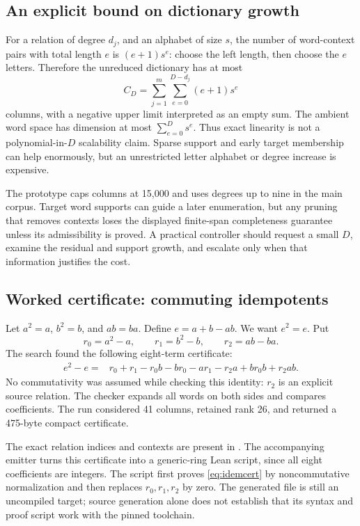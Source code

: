 \documentclass[11pt,letterpaper]{article}
\theoremstyle{definition}\newtheorem{definition}[theorem]{Definition}
\theoremstyle{remark}\newtheorem{remark}[theorem]{Remark}
\begin{document}
\subsection{An explicit bound on dictionary growth}
For a relation of degree $d_j$, and an alphabet of size $s$, the number of
word-context pairs with total length $e$ is $(e+1)s^e$: choose the left length,
then choose the $e$ letters. Therefore the unreduced dictionary has at most
\begin{equation}
 C_D=\sum_{j=1}^m\sum_{e=0}^{D-d_j}(e+1)s^e
 \label{eq:nccost}
\end{equation}
columns, with a negative upper limit interpreted as an empty sum. The ambient
word space has dimension at most $\sum_{e=0}^{D}s^e$.
Thus exact linearity is not a polynomial-in-$D$ scalability claim. Sparse
support and early target membership can help enormously, but an unrestricted
letter alphabet or degree increase is expensive.

The prototype caps columns at 15,000 and uses degrees up to nine in the main
corpus. Target word supports can guide a later enumeration, but any pruning
that removes contexts loses the displayed finite-span completeness guarantee
unless its admissibility is proved. A practical controller should request a
small $D$, examine the residual and support growth, and escalate only when that
information justifies the cost.

\subsection{Worked certificate: commuting idempotents}
Let $a^2=a$, $b^2=b$, and $ab=ba$. Define $e=a+b-ab$. We want $e^2=e$.
Put
\[
 r_0=a^2-a,\qquad r_1=b^2-b,\qquad r_2=ab-ba.
\]
The search found the following eight-term certificate:
\begin{align}
 e^2-e={}&r_0+r_1-r_0b-br_0-ar_1-r_2a
             +br_0b+r_2ab.\label{eq:idemcert}
\end{align}
No commutativity was assumed while checking this identity: $r_2$ is an explicit
source relation. The checker expands all words on both sides and compares
coefficients. The run considered 41 columns, retained rank 26, and returned a
475-byte compact certificate.

The exact relation indices and contexts are present in
. The accompanying emitter turns this
certificate into a generic-ring Lean script, since all eight coefficients are
integers. The script first proves \eqref{eq:idemcert} by noncommutative
normalization and then replaces $r_0,r_1,r_2$ by zero. The generated file is
still an uncompiled target; source generation alone does not establish that its
syntax and proof script work with the pinned toolchain.
\end{document}
